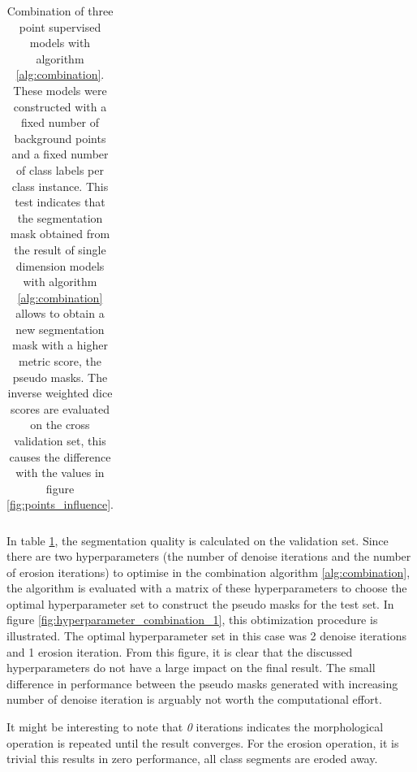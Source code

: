 \begin{table}
\begin{tabular}{l|lll}
        \end{tabular}
    \caption{Combination of three point supervised models with algorithm \ref{alg:combination}. 
    These models were constructed with a fixed number of background points and a fixed number of class labels per class instance.
    This test indicates that the segmentation mask obtained from the result of single dimension models with algorithm \ref{alg:combination} allows to obtain a new segmentation mask with a higher metric score, the pseudo masks.
    The inverse weighted dice scores are evaluated on the cross validation set, this causes the difference with the values in figure \ref{fig:points_influence}. \label{tab:combination_1}
    }

\end{table}
\par{
    In table \ref{tab:combination_1}, the segmentation quality is calculated on the validation set.
    Since there are two hyperparameters (the number of denoise iterations and the number of erosion iterations) to optimise in the combination algorithm \ref{alg:combination}, 
    the algorithm is evaluated with a matrix of these hyperparameters to choose the optimal hyperparameter set to construct the pseudo masks for the test set.
    In figure \ref{fig:hyperparameter_combination_1}, this obtimization procedure is illustrated.
    The optimal hyperparameter set in this case was 2 denoise iterations and 1 erosion iteration.
    From this figure, it is clear that the discussed hyperparameters do not have a large impact on the final result.
    The small difference in performance between the pseudo masks generated with increasing number of denoise iteration is arguably not worth the computational effort.
}
\par{
    It might be interesting to note that \textit{0} iterations indicates the morphological operation is repeated until the result converges.
    For the erosion operation, it is trivial this results in zero performance, all class segments are eroded away. 
}

